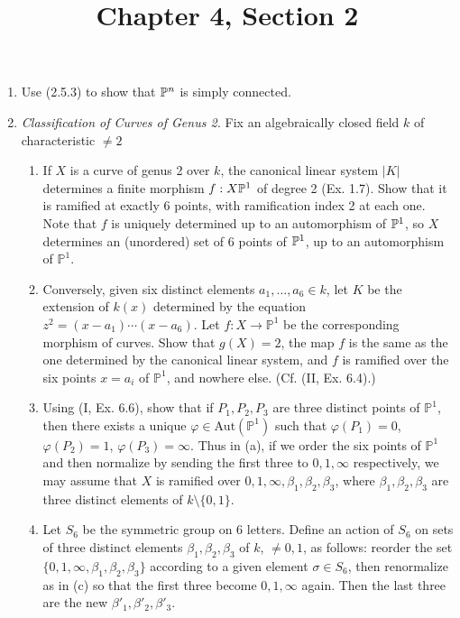 \documentclass{article}
\title{Chapter 4, Section 2}
\begin{document}
\maketitle
\begin{enumerate} [label=\textbf{\arabic*.}, leftmargin=0em]

\item Use (2.5.3) to show that $\mathbb{P}^n$ is simply connected.

\item \textit{Classification of Curves of Genus 2.} Fix an algebraically closed field $k$ of characteristic $\neq 2$
\begin{enumerate} [label=(\alph*)]
    \item If $X$ is a curve of genus 2 over $k$, the canonical linear system $|K|$ determines a finite morphism $f: X \mathbb{P}^1$ of degree 2 (Ex. 1.7).
    Show that it is ramified at exactly 6 points, with ramification index 2 at each one.
    Note that $f$ is uniquely determined up to an automorphism of $\mathbb{P}^1$, so $X$ determines an (unordered) set of 6 points of $\mathbb{P}^1$, up to an automorphism of $\mathbb{P}^1$.

    \item Conversely, given six distinct elements $a_1, \dots, a_6 \in k$, let $K$ be the extension of $k(x)$ determined by the equation $z^2 = (x - a_1)\cdots(x - a_6)$.
    Let $f: X \to \mathbb{P}^1$ be the corresponding morphism of curves.
    Show that $g(X) = 2$, the map $f$ is the same as the one determined by the canonical linear system, and $f$ is ramified over the six points $x = a_i$ of $\mathbb{P}^1$, and nowhere else. (Cf. (II, Ex. 6.4).)

    \item Using (I, Ex. 6.6), show that if $P_1, P_2, P_3$ are three distinct points of $\mathbb{P}^1$, then there exists a unique $\varphi \in \text{Aut}(\mathbb{P}^1)$ such that $\varphi(P_1) = 0$, $\varphi(P_2) = 1$, $\varphi(P_3) = \infty$.
    Thus in (a), if we order the six points of $\mathbb{P}^1$ and then normalize by sending the first three to $0,1,\infty$ respectively, we may assume that $X$ is ramified over $0,1,\infty,\beta_1,\beta_2,\beta_3$, where $\beta_1, \beta_2, \beta_3$ are three distinct elements of $k \setminus \{0,1\}$.

    \item Let $S_6$ be the symmetric group on 6 letters.
    Define an action of $S_6$ on sets of three distinct elements $\beta_1, \beta_2, \beta_3$ of $k$, $\neq 0,1$, as follows:
    reorder the set $\{0,1,\infty,\beta_1,\beta_2,\beta_3\}$ according to a given element $\sigma \in S_6$, then renormalize as in (c) so that the first three become $0,1,\infty$ again.
    Then the last three are the new $\beta'_1, \beta'_2, \beta'_3$.


\end{enumerate}
\end{enumerate}
\end{document}
